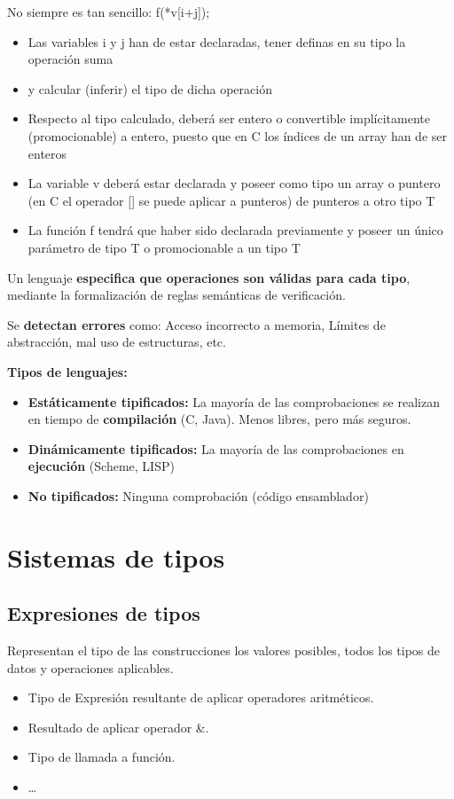 \documentclass[12pt, twoside, openright]{report} %
\begin{document}
No siempre es tan sencillo: f(*v[i+j]);
\begin{itemize}
	\item Las variables i y j han de estar declaradas, tener definas en su tipo
	      la operación suma
	\item y calcular (inferir) el tipo de dicha operación
	\item Respecto al tipo calculado, deberá ser entero o convertible
	      implícitamente (promocionable) a entero, puesto que en C los
	      índices de un array han de ser enteros
	\item La variable v deberá estar declarada y poseer como tipo un array o
	      puntero (en C el operador [] se puede aplicar a punteros) de
	      punteros a otro tipo T
	\item La función f tendrá que haber sido declarada previamente y poseer
	      un único parámetro de tipo T o promocionable a un tipo T
\end{itemize}

Un lenguaje \textbf{especifica que operaciones son válidas para cada tipo}, mediante la formalización de reglas semánticas de verificación.

Se \textbf{detectan errores} como: Acceso incorrecto a memoria, Límites de abstracción, mal uso de estructuras, etc.

\textbf{Tipos de lenguajes:}
\begin{itemize}
	\item \textbf{Estáticamente tipificados:} La mayoría de las comprobaciones se realizan en tiempo de \textbf{compilación} (C, Java). Menos libres, pero más seguros.
	\item \textbf{Dinámicamente tipificados:} La mayoría de las comprobaciones en \textbf{ejecución} (Scheme, LISP)
	\item \textbf{No tipificados:} Ninguna comprobación (código ensamblador)
\end{itemize}

\section{Sistemas de tipos}
\subsection{Expresiones de tipos}
Representan el tipo de las construcciones los valores posibles, todos los tipos de datos y operaciones aplicables.
\begin{itemize}
	\item Tipo de Expresión resultante de aplicar operadores aritméticos.
	\item Resultado de aplicar operador \&.
	\item Tipo de llamada a función.
	\item …
\end{itemize}
\end{document}
